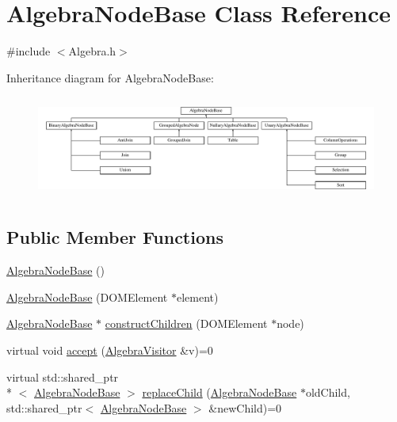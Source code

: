 \hypertarget{class_algebra_node_base}{\section{Algebra\+Node\+Base Class Reference}
\label{class_algebra_node_base}
}


{\ttfamily \#include $<$Algebra.\+h$>$}

Inheritance diagram for Algebra\+Node\+Base\+:\begin{figure}[H]
\begin{center}
\leavevmode
\includegraphics[height=3.414634cm]{class_algebra_node_base}
\end{center}
\end{figure}
\subsection*{Public Member Functions}
\begin{DoxyCompactItemize}
\item 
\hyperlink{class_algebra_node_base_a8905b9abbf0ef7c0f84b79c8d0c100d8}{Algebra\+Node\+Base} ()
\item 
\hyperlink{class_algebra_node_base_af86499c41554b02be3fb17da057b60ad}{Algebra\+Node\+Base} (D\+O\+M\+Element $\ast$element)
\item 
\hyperlink{class_algebra_node_base}{Algebra\+Node\+Base} $\ast$ \hyperlink{class_algebra_node_base_a19f93dd9f8b3da0a216a37f2ceb61ebe}{construct\+Children} (D\+O\+M\+Element $\ast$node)
\item 
virtual void \hyperlink{class_algebra_node_base_a33bee3ec6fe1eb4228c0471c95c90d66}{accept} (\hyperlink{class_algebra_visitor}{Algebra\+Visitor} \&v)=0
\item 
virtual std\+::shared\+\_\+ptr\\*
$<$ \hyperlink{class_algebra_node_base}{Algebra\+Node\+Base} $>$ \hyperlink{class_algebra_node_base_aa9bdd02b0ddf793bda18bd146ccacb0d}{replace\+Child} (\hyperlink{class_algebra_node_base}{Algebra\+Node\+Base} $\ast$old\+Child, std\+::shared\+\_\+ptr$<$ \hyperlink{class_algebra_node_base}{Algebra\+Node\+Base} $>$ \&new\+Child)=0
\end{DoxyCompactItemize}

